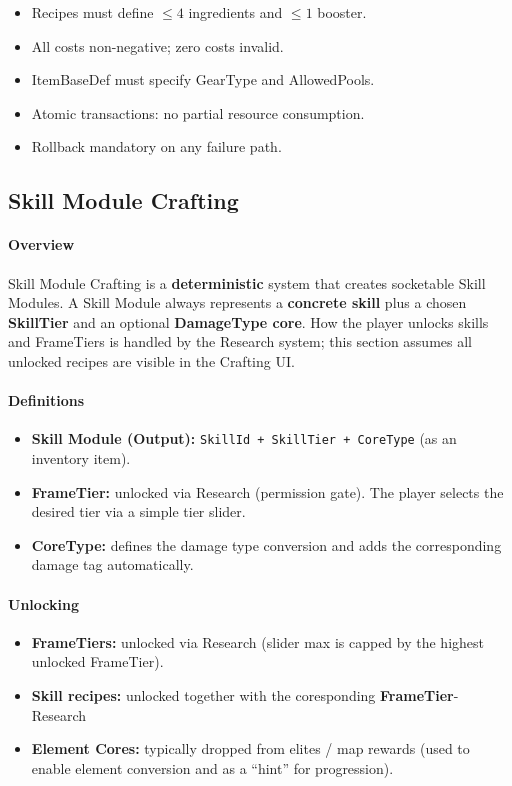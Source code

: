\begin{itemize}
	\item Recipes must define $\leq 4$ ingredients and $\leq 1$ booster.
	\item All costs non-negative; zero costs invalid.
	\item ItemBaseDef must specify GearType and AllowedPools.
	\item Atomic transactions: no partial resource consumption.
	\item Rollback mandatory on any failure path.
\end{itemize}


\subsection{Skill Module Crafting}

\paragraph{Overview}
Skill Module Crafting is a \textbf{deterministic} system that creates socketable Skill Modules.
A Skill Module always represents a \textbf{concrete skill} plus a chosen \textbf{SkillTier} and an optional \textbf{DamageType core}.
How the player unlocks skills and FrameTiers is handled by the Research system; this section assumes all unlocked recipes are visible in the Crafting UI.

\paragraph{Definitions}
\begin{itemize}
	\item \textbf{Skill Module (Output):} \texttt{SkillId + SkillTier + CoreType} (as an inventory item).
	\item \textbf{FrameTier:} unlocked via Research (permission gate). The player selects the desired tier via a simple tier slider.
	\item \textbf{CoreType:} defines the damage type conversion and adds the corresponding damage tag automatically.
\end{itemize}

\paragraph{Unlocking}
\begin{itemize}
	\item \textbf{FrameTiers:} unlocked via Research (slider max is capped by the highest unlocked FrameTier).
	\item \textbf{Skill recipes:} unlocked together with the coresponding \textbf{FrameTier}-Research
	\item \textbf{Element Cores:} typically dropped from elites / map rewards (used to enable element conversion and as a ``hint'' for progression).
\end{itemize}

